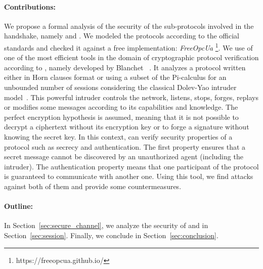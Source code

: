 \paragraph{Contributions:}

We propose a formal analysis of the security of
the sub-protocols involved in the \opcua handshake, namely \opcua{}
\securechan and \opcua{} \session.  
We modeled the protocols according to the official \opcua standards and
checked it against a free implementation: {\em FreeOpcUa}
\footnote{https://freeopcua.github.io/}.
We use of one of the most efficient tools in the domain of
cryptographic protocol verification according to \cite{LP15},
namely \proverif developed by Blanchet \etal~\cite{Bla01}.  It
analyzes a protocol written either in Horn clauses format or using a
subset of the Pi-calculus for an unbounded number of sessions
considering the classical Dolev-Yao intruder model~\cite{DY81}.  This
powerful intruder controls the network, listens, stops, forges,
replays or modifies some messages according to its capabilities and
knowledge.  The perfect encryption hypothesis is assumed, meaning that
it is not possible to decrypt a ciphertext without its encryption key
or to forge a signature without knowing the secret key.  In this
context, \proverif{} can verify security properties of a protocol such
as secrecy and authentication.  The first property ensures that a
secret message cannot be discovered by an unauthorized agent
(including the intruder).  The authentication property means that one
participant of the protocol is guaranteed to communicate with another
one. Using this tool, we find attacks against both of them and provide
some countermeasures.

\paragraph{Outline:} In Section~\ref{sec:secure_channel}, we analyze the
security of \opcua{} \securechan and \opcua{} \session in
Section~\ref{sec:session}.  Finally, we conclude in
Section~\ref{sec:conclusion}.

